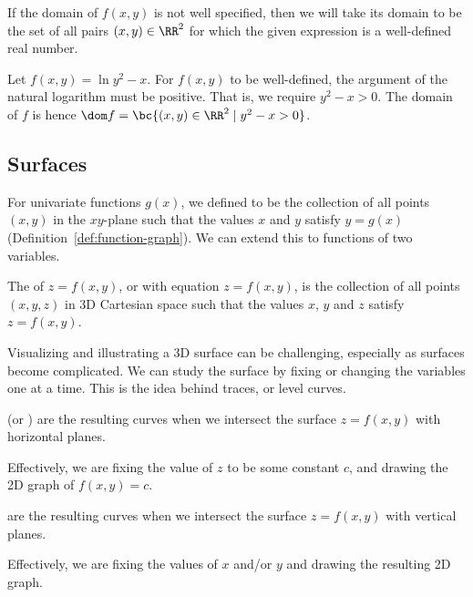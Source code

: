 If the domain of $f(x, y)$ is not well specified, then we will take its domain to be the set of all pairs $(x, y) \in \RR^2$ for which the given expression is a well-defined real number.

\begin{example}[Domain of $f(x, y)$]
    Let $f(x, y) = \ln{y^2 - x}$. For $f(x, y)$ to be well-defined, the argument of the natural logarithm must be positive. That is, we require $y^2 - x > 0$. The domain of $f$ is hence $\dom f = \bc{(x, y) \in \RR^2 \mid y^2 - x > 0}$.
\end{example}

\subsection{Surfaces}

For univariate functions $g(x)$, we defined to be the collection of all points $(x, y)$ in the $xy$-plane such that the values $x$ and $y$ satisfy $y = g(x)$ (Definition~\ref{def:function-graph}). We can extend this to functions of two variables.

\begin{definition}
    The  of $z = f(x, y)$, or  with equation $z = f(x, y)$, is the collection of all points $(x, y, z)$ in 3D Cartesian space such that the values $x$, $y$ and $z$ satisfy $z = f(x, y)$.
\end{definition}

Visualizing and illustrating a 3D surface can be challenging, especially as surfaces become complicated. We can study the surface by fixing or changing the variables one at a time. This is the idea behind traces, or level curves.

\begin{definition}
     (or ) are the resulting curves when we intersect the surface $z = f(x, y)$ with horizontal planes.
\end{definition}

Effectively, we are fixing the value of $z$ to be some constant $c$, and drawing the 2D graph of $f(x, y) = c$.

\begin{definition}
     are the resulting curves when we intersect the surface $z = f(x, y)$ with vertical planes.
\end{definition}

Effectively, we are fixing the values of $x$ and/or $y$ and drawing the resulting 2D graph.


